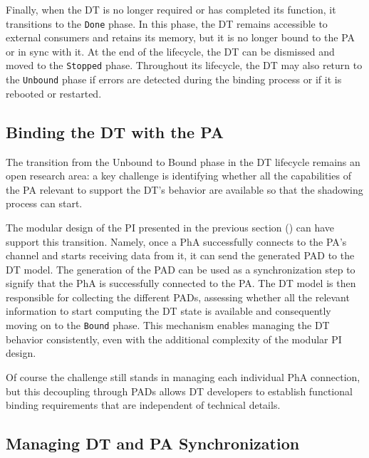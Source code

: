 Finally, when the \ac{DT} is no longer required or has completed its function, it transitions to the \texttt{Done} phase.
In this phase, the \ac{DT} remains accessible to external consumers and retains its memory, but it is no longer bound to the \ac{PA} or in sync with it. At the end of the lifecycle, the \ac{DT} can be dismissed and moved to the \texttt{Stopped} phase.
Throughout its lifecycle, the \ac{DT} may also return to the \texttt{Unbound} phase if errors are detected during the binding process or if it is rebooted or restarted.


\subsection{Binding the DT with the PA}

The transition from the Unbound to Bound phase in the \ac{DT} lifecycle remains an open research area:
a key challenge is identifying whether all the capabilities of the \ac{PA} relevant to support the \ac{DT}'s behavior are available so that the shadowing process can start.

The modular design of the \ac{PI} presented in the previous section () can have support this transition.
%
Namely, once a \ac{PhA} successfully connects to the \ac{PA}'s channel and starts receiving data from it, it can send the generated \ac{PAD} to the \ac{DT} model.
The generation of the \ac{PAD} can be used as a synchronization step to signify that the \ac{PhA} is successfully connected to the \ac{PA}.
%
The \ac{DT} model is then responsible for collecting the different \acp{PAD}, assessing whether all the relevant information to start computing the \ac{DT} state is available and consequently moving on to the \texttt{Bound} phase.
%
This mechanism enables managing the \ac{DT} behavior consistently, even with the additional complexity of the modular \ac{PI} design.

Of course the challenge still stands in managing each individual \ac{PhA} connection, but this decoupling through \acp{PAD} allows \ac{DT} developers to establish functional binding requirements that are independent of technical details. 

\subsection{Managing DT and PA Synchronization}


